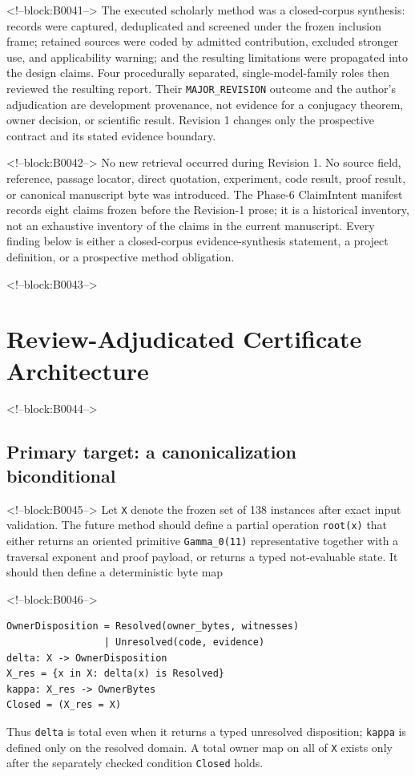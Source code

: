 \documentclass[11pt]{article}
\begin{document}
<!--block:B0041-->
The executed scholarly method was a closed-corpus synthesis: records were
captured, deduplicated and screened under the frozen inclusion frame; retained
sources were coded by admitted contribution, excluded stronger use, and
applicability warning; and the resulting limitations were propagated into the
design claims. Four procedurally separated, single-model-family roles then
reviewed the resulting report. Their \texttt{MAJOR\_REVISION} outcome and the
author's adjudication are development provenance, not evidence for a conjugacy
theorem, owner decision, or scientific result. Revision 1 changes only the
prospective contract and its stated evidence boundary.

<!--block:B0042-->
No new retrieval occurred during Revision 1. No source field, reference,
passage locator, direct quotation, experiment, code result, proof
result, or canonical manuscript byte was introduced. The Phase-6
ClaimIntent manifest records eight claims frozen before the Revision-1
prose; it is a historical inventory, not an exhaustive inventory of the
claims in the current manuscript. Every finding below is
either a closed-corpus evidence-synthesis statement, a project
definition, or a prospective method obligation.

<!--block:B0043-->
\hypertarget{4-review-adjudicated-certificate-architecture}{%
\section{Review-Adjudicated Certificate
Architecture}\label{4-review-adjudicated-certificate-architecture}}

<!--block:B0044-->
\hypertarget{41-primary-target-a-canonicalization-biconditional}{%
\subsection{Primary target: a canonicalization
biconditional}\label{41-primary-target-a-canonicalization-biconditional}}

<!--block:B0045-->
Let \texttt{X} denote the frozen set of 138 instances after exact input
validation. The future method should define a partial operation
\texttt{root(x)} that either returns an oriented primitive
\texttt{Gamma\_0(11)} representative together with a traversal exponent
and proof payload, or returns a typed not-evaluable state. It should
then define a deterministic byte map

<!--block:B0046-->
\begin{verbatim}
OwnerDisposition = Resolved(owner_bytes, witnesses)
                 | Unresolved(code, evidence)
delta: X -> OwnerDisposition
X_res = {x in X: delta(x) is Resolved}
kappa: X_res -> OwnerBytes
Closed = (X_res = X)
\end{verbatim}
Thus \texttt{delta} is total even when it returns a typed unresolved disposition;
\texttt{kappa} is defined only on the resolved domain.  A total owner map on all
of \texttt{X} exists only after the separately checked condition
\texttt{Closed} holds.
\end{document}
